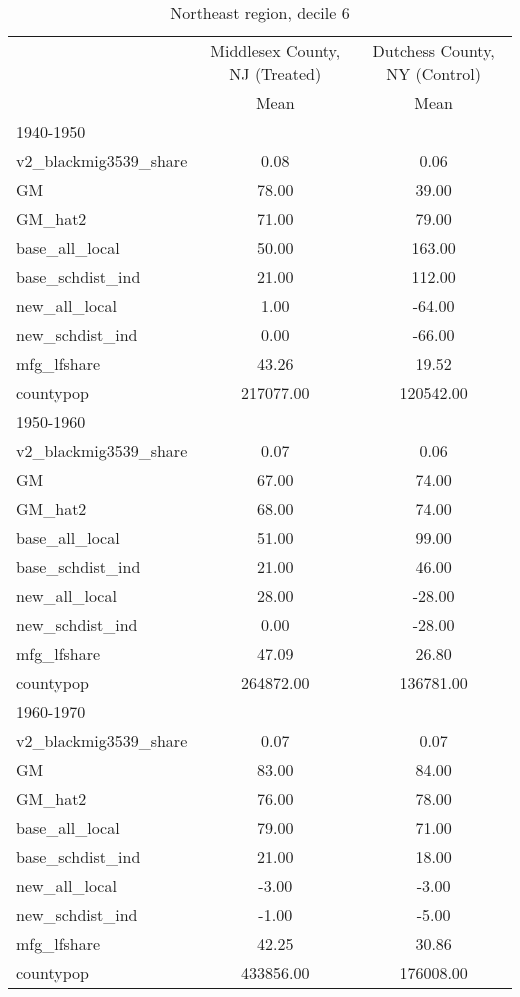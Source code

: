 \begin{table}[htbp]\centering
\def\sym#1{\ifmmode^{#1}\else\(^{#1}\)\fi}
\caption{Northeast region, decile 6 \label{tab1}}
\begin{tabular}{l*{2}{c}}
\toprule
                    &\multicolumn{1}{c}{Middlesex County, NJ (Treated)}&\multicolumn{1}{c}{Dutchess County, NY (Control)}\\
                    &        Mean&        Mean\\
\midrule
1940-1950           &            &            \\
v2\_blackmig3539\_share&        0.08&        0.06\\
GM                  &       78.00&       39.00\\
GM\_hat2             &       71.00&       79.00\\
base\_all\_local      &       50.00&      163.00\\
base\_schdist\_ind    &       21.00&      112.00\\
new\_all\_local       &        1.00&      -64.00\\
new\_schdist\_ind     &        0.00&      -66.00\\
mfg\_lfshare         &       43.26&       19.52\\
countypop           &   217077.00&   120542.00\\
\midrule
1950-1960           &            &            \\
v2\_blackmig3539\_share&        0.07&        0.06\\
GM                  &       67.00&       74.00\\
GM\_hat2             &       68.00&       74.00\\
base\_all\_local      &       51.00&       99.00\\
base\_schdist\_ind    &       21.00&       46.00\\
new\_all\_local       &       28.00&      -28.00\\
new\_schdist\_ind     &        0.00&      -28.00\\
mfg\_lfshare         &       47.09&       26.80\\
countypop           &   264872.00&   136781.00\\
\midrule
1960-1970           &            &            \\
v2\_blackmig3539\_share&        0.07&        0.07\\
GM                  &       83.00&       84.00\\
GM\_hat2             &       76.00&       78.00\\
base\_all\_local      &       79.00&       71.00\\
base\_schdist\_ind    &       21.00&       18.00\\
new\_all\_local       &       -3.00&       -3.00\\
new\_schdist\_ind     &       -1.00&       -5.00\\
mfg\_lfshare         &       42.25&       30.86\\
countypop           &   433856.00&   176008.00\\
\bottomrule
\end{tabular}
\end{table}
